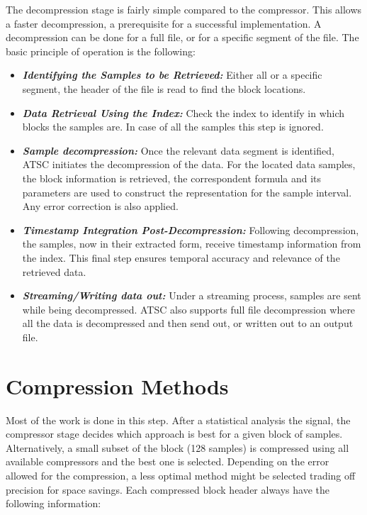 \documentclass[conference]{IEEEtran}
\begin{document}
The decompression stage is fairly simple compared to the compressor.
This allows a faster decompression, a prerequisite for a successful implementation.
A decompression can be done for a full file, or for a specific segment of the file.
The basic principle of operation is the following:
\begin{itemize}
\item{\textbf{\textit{Identifying the Samples to be Retrieved:}}} Either all or a specific segment, the header of the file is read to find the block locations.
\item{\textbf{\textit{Data Retrieval Using the Index:}}} Check the index to identify in which blocks the samples are. In case of all the samples this step is ignored.
\item{\textbf{\textit{Sample decompression:}}} Once the relevant data segment is identified, ATSC initiates the decompression of the data.
For the located data samples, the block information is retrieved, the correspondent formula and its parameters are used to construct the representation for the sample interval. Any error correction is also applied.
\item{\textbf{\textit{Timestamp Integration Post-Decompression:}}} Following decompression, the samples, now in their extracted form, receive timestamp information from the index. This final step ensures temporal accuracy and relevance of the retrieved data.
\item{\textbf{\textit{Streaming/Writing data out:}}} Under a streaming process, samples are sent while being decompressed. ATSC also supports full file decompression where all the data is decompressed and then send out, or written out to an output file.
\end{itemize}

\section{Compression Methods}\label{section:compression}

Most of the work is done in this step. 
After a statistical analysis the signal, the compressor stage decides which approach is best for a given block of samples.
Alternatively, a small subset of the block (128 samples) is compressed using all available compressors and the best one is selected.
Depending on the error allowed for the compression, a less optimal method might be selected trading off precision for space savings. 
Each compressed block header always have the following information:
\end{document}
